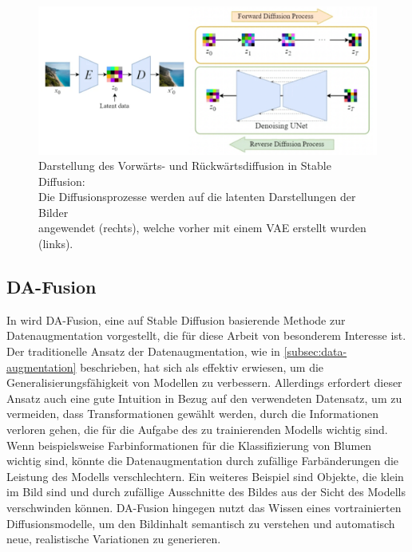 \begin{figure}[h]
	\centering
	\includegraphics[width=\textwidth]{figure_stable-diffusion_merged.png}
	\caption[Darstellung des Vorwärts- und Rückwärtsdiffusion in Stable Diffusion: Die Diffusionsprozesse werden auf die latenten Darstellungen der Bilder angewendet (rechts), welche vorher mit einem VAE erstellt wurden (links).]{Darstellung des Vorwärts- und Rückwärtsdiffusion in Stable Diffusion:\\
		Die	Diffusionsprozesse werden auf die latenten Darstellungen der Bilder\\
		angewendet (rechts), welche vorher mit einem VAE erstellt wurden (links).}
	\label{fig:stable-diffusion}
\end{figure}

\subsection{DA-Fusion} \label{subsec:da-fusion}

In \parencite{Trabucco2023dafusion} wird DA-Fusion, eine auf Stable Diffusion basierende Methode zur Datenaugmentation vorgestellt, die für diese Arbeit von besonderem Interesse ist. Der traditionelle Ansatz der Datenaugmentation, wie in \autoref{subsec:data-augmentation} beschrieben, hat sich als effektiv erwiesen, um die Generalisierungsfähigkeit von Modellen zu verbessern. Allerdings erfordert dieser Ansatz auch eine gute Intuition in Bezug auf den verwendeten Datensatz, um zu vermeiden, dass Transformationen gewählt werden, durch die Informationen verloren gehen, die für die Aufgabe des zu trainierenden Modells wichtig sind. Wenn beispielsweise Farbinformationen für die Klassifizierung von Blumen wichtig sind, könnte die Datenaugmentation durch zufällige Farbänderungen die Leistung des Modells verschlechtern. Ein weiteres Beispiel sind Objekte, die klein im Bild sind und durch zufällige Ausschnitte des Bildes aus der Sicht des Modells verschwinden können. DA-Fusion hingegen nutzt das Wissen eines vortrainierten Diffusionsmodelle, um den Bildinhalt semantisch zu verstehen und automatisch neue, realistische Variationen zu generieren.


